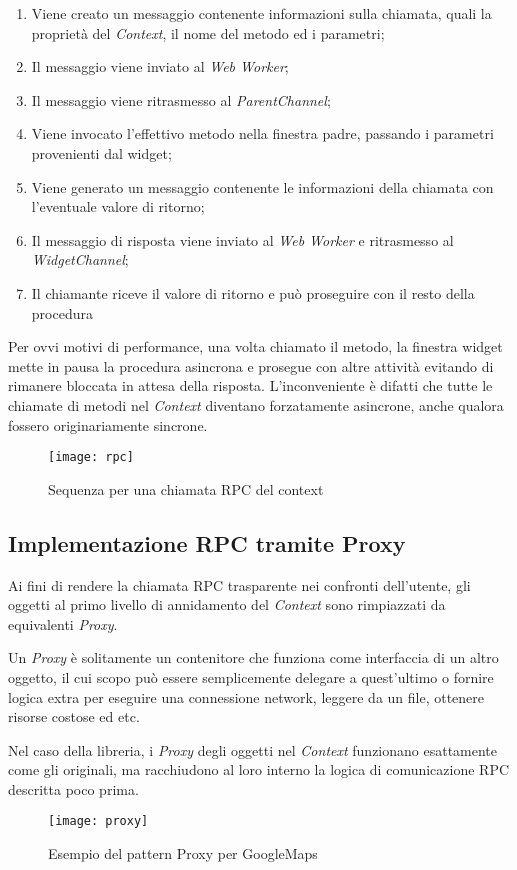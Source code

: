 \begin{enumerate}
  \item Viene creato un messaggio contenente informazioni sulla chiamata, quali la proprietà del \textit{Context}, il nome del metodo ed i parametri;
  \item Il messaggio viene inviato al \textit{Web Worker};
  \item Il messaggio viene ritrasmesso al \textit{ParentChannel};
  \item Viene invocato l'effettivo metodo nella finestra padre, passando i parametri provenienti dal widget;
  \item Viene generato un messaggio contenente le informazioni della chiamata con l'eventuale valore di ritorno;
  \item Il messaggio di risposta viene inviato al \textit{Web Worker} e ritrasmesso al \textit{WidgetChannel};
  \item Il chiamante riceve il valore di ritorno e può proseguire con il resto della procedura
\end{enumerate}

Per ovvi motivi di performance, una volta chiamato il metodo, la finestra widget mette in pausa la procedura asincrona e prosegue con altre attività evitando di rimanere bloccata in attesa della risposta. L'inconveniente è difatti che tutte le chiamate di metodi nel \textit{Context} diventano forzatamente asincrone, anche qualora fossero originariamente sincrone.

\begin{figure}[H] 
  \centering 
  \texttt{[image: rpc]} 
  \caption{Sequenza per una chiamata RPC del context}
\end{figure}


\subsection{Implementazione RPC tramite Proxy}

Ai fini di rendere la chiamata RPC trasparente nei confronti dell'utente, gli oggetti al primo livello di annidamento del \textit{Context} sono rimpiazzati da equivalenti \textit{Proxy}.

Un \textit{Proxy} è solitamente un contenitore che funziona come interfaccia di un altro oggetto, il cui scopo può essere semplicemente delegare a quest'ultimo o fornire logica extra per eseguire una connessione network, leggere da un file, ottenere risorse costose ed etc.

Nel caso della libreria, i \textit{Proxy} degli oggetti nel \textit{Context} funzionano esattamente come gli originali, ma racchiudono al loro interno la logica di comunicazione RPC descritta poco prima.

\begin{figure}[H] 
  \centering 
  \texttt{[image: proxy]} 
  \caption{Esempio del pattern Proxy per GoogleMaps}
\end{figure}
